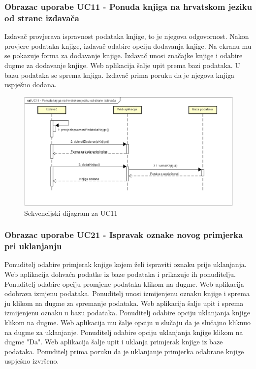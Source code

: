 			\eject
			
			\subsubsection{Obrazac uporabe UC11 - Ponuda knjiga na hrvatskom jeziku od strane izdavača}
			Izdavač provjerava ispravnost podataka knjige, to je njegova odgovornost. Nakon provjere podataka knjige, izdavač odabire opciju dodavanja knjige. Na ekranu mu se pokazuje forma za dodavanje knjige. Izdavač unosi značajke knjige i odabire dugme za dodavanje knjige. Web aplikacija šalje upit prema bazi podataka. U bazu podataka se sprema knjiga. Izdavač prima poruku da je njegova knjiga uspješno dodana.
			
			
				\begin{figure}[H]
					\includegraphics[width=\textwidth]{dijagrami/SequenceDiagram3.PNG} %
					\centering
					\caption{Sekvencijski dijagram za UC11}
					\label{fig:seqdiag3}
				\end{figure}
			
			\eject
			
			\subsubsection{Obrazac uporabe UC21 - Ispravak oznake novog primjerka pri uklanjanju}
			Ponuditelj odabire primjerak knjige kojem želi ispraviti oznaku prije uklanjanja. Web aplikacija dohvaća podatke iz baze podataka i prikazuje ih ponuditelju. Ponuditelj odabire opciju promjene podataka klikom na dugme. Web aplikacija odobrava izmjenu podataka. Ponuditelj unosi izmijenjenu oznaku knjige i sprema ju klikom na dugme za spremanje podataka. Web aplikacija šalje upit i sprema izmijenjenu oznaku u bazu podataka. Ponuditelj odabire opciju uklanjanja knjige klikom na dugme. Web aplikacija mu šalje opciju u slučaju da je slučajno kliknuo na dugme za uklanjanje. Ponuditelj odabire opciju uklanjanja knjige klikom na dugme "Da". Web aplikacija šalje upit i uklanja primjerak knjige iz baze podataka. Ponuditelj prima poruku da je uklanjanje primjerka odabrane knjige uspješno izvršeno.
			
